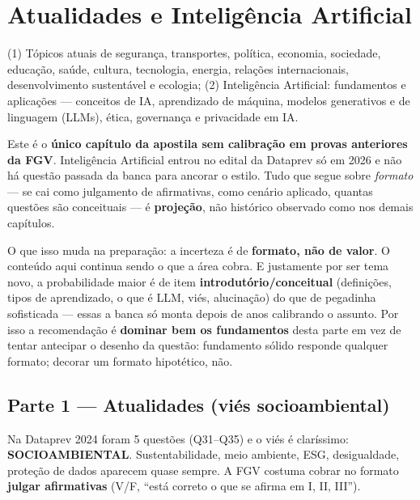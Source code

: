 \chapter{Atualidades e Inteligência Artificial}
\label{cap:atualidades}

\begin{edital}
(1) Tópicos atuais de segurança, transportes, política, economia, sociedade,
educação, saúde, cultura, tecnologia, energia, relações internacionais,
desenvolvimento sustentável e ecologia; (2) Inteligência Artificial:
fundamentos e aplicações --- conceitos de IA, aprendizado de máquina, modelos
generativos e de linguagem (LLMs), ética, governança e privacidade em IA.
\end{edital}

\begin{conceito}
Este é o \textbf{único capítulo da apostila sem calibração em provas
anteriores da FGV}. Inteligência Artificial entrou no edital da Dataprev só
em 2026 e não há questão passada da banca para ancorar o estilo. Tudo que
segue sobre \emph{formato} --- se cai como julgamento de afirmativas, como
cenário aplicado, quantas questões são conceituais --- é \textbf{projeção},
não histórico observado como nos demais capítulos.

O que isso muda na preparação: a incerteza é de \textbf{formato, não de
valor}. O conteúdo aqui continua sendo o que a área cobra. E justamente por
ser tema novo, a probabilidade maior é de item \textbf{introdutório/conceitual}
(definições, tipos de aprendizado, o que é LLM, viés, alucinação) do que de
pegadinha sofisticada --- essas a banca só monta depois de anos calibrando o
assunto. Por isso a recomendação é \textbf{dominar bem os fundamentos} desta
parte em vez de tentar antecipar o desenho da questão: fundamento sólido
responde qualquer formato; decorar um formato hipotético, não.
\end{conceito}

\section{Parte 1 --- Atualidades (viés socioambiental)}

Na Dataprev 2024 foram 5 questões (Q31--Q35) e o viés é claríssimo:
\textbf{SOCIOAMBIENTAL}. Sustentabilidade, meio ambiente, ESG, desigualdade,
proteção de dados aparecem quase sempre. A FGV costuma cobrar no formato
\textbf{julgar afirmativas} (V/F, ``está correto o que se afirma em I, II,
III'').

